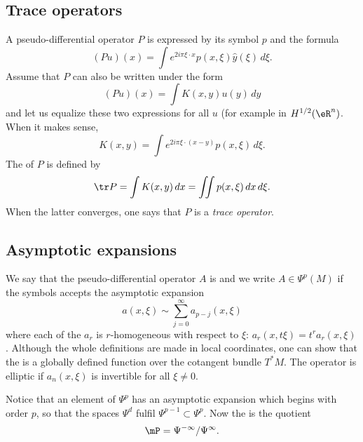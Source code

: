 \subsection{Trace operators}  \label{subsec_traceop}

A pseudo-differential operator $P$ is expressed by its symbol $p$ and the formula
\[ 
  (Pu)(x)=\int  e^{2i\pi \xi\cdot x}p(x,\xi)\hat y(\xi)\,d\xi.
\]
Assume that $P$ can also be written under the form
\[
  (Pu)(x)=\int K(x,y)u(y)\,dy
\]
and let us equalize these two expressions for all $u$ (for example in $H^{1/2}(\eR^n)$. When it makes sense,
\begin{equation}
  K(x,y)=\int e^{2i\pi \xi\cdot (x-y)}p(x,\xi)\,d\xi.
\end{equation}
The  of $P$ is defined by
\begin{equation}
\tr P=\int K(x,y)\,dx
	=\iint p(x,\xi)\,dx\,d\xi.
\end{equation}
When the latter converges, one says that $P$ is a \emph{trace operator}.

\subsection{Asymptotic expansions}

We say that the pseudo-differential operator $A$ is  and we write $A\in\Psi^p(M)$ if the symbols accepts the asymptotic expansion 
\[ 
  a(x,\xi)\sim\sum_{j=0}^{\infty}a_{p-j}(x,\xi)
\]
where each of the $a_r$ is $r$-homogeneous with respect to $\xi$: $a_r(x,t\xi)=t^ra_r(x,\xi)$. Although the whole definitions are made in local coordinates, one can show that the  is a globally defined function over the cotangent bundle $T^*M$. The operator is elliptic if $a_n(x,\xi)$ is invertible for all $\xi\neq 0$. 

Notice that an element of $\Psi^p$ has an asymptotic expansion which begins with order $p$, so that the spaces $\Psi^d$ fulfil $\Psi^{p-1}\subset\Psi^p$. Now the  is the quotient 
\begin{equation}		\label{EqDefmPalgOpeClass}
\mP=\Psi^{-\infty}/\Psi^{\infty}.
\end{equation}

